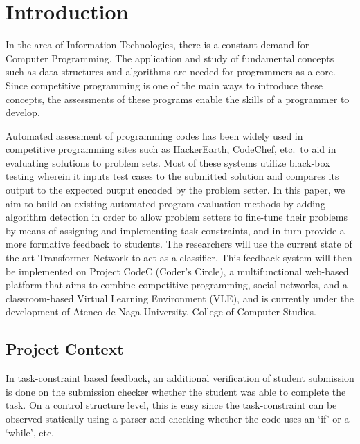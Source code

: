 \chapter{Introduction}


In the area of Information Technologies, there is a constant demand for Computer Programming. 
The application and study of fundamental concepts such as data structures and algorithms are 
needed for programmers as a core. Since competitive programming is one of the main ways to 
introduce these concepts, the assessments of these programs enable the skills of a programmer 
to develop\cite{oqvist2018coding}.

Automated assessment of programming codes has been widely used in competitive programming 
sites such as HackerEarth, CodeChef, etc.\ to aid in evaluating solutions to problem sets. 
Most of these systems utilize black-box testing wherein it inputs test cases to the submitted 
solution and compares its output to the expected output encoded by the problem setter. 
In this paper, we aim to build on existing automated program evaluation methods by adding 
algorithm detection in order to allow problem setters to fine-tune their problems by means of 
assigning and implementing task-constraints, and in turn provide a more formative feedback to 
students. The researchers will use the current state of the art Transformer Network to act as 
a classifier. This feedback system will then be implemented on Project CodeC (Coder’s Circle), 
a multifunctional web-based platform that aims to combine competitive programming, social networks, 
and a classroom-based Virtual Learning Environment (VLE), and is currently under the development 
of Ateneo de Naga University, College of Computer Studies.




\section{Project Context}

In task-constraint based feedback, an additional verification of student submission is done 
on the submission checker whether the student was able to complete the task. On a control 
structure level, this is easy since the task-constraint can be observed statically using a 
parser and checking whether the code uses an `if' or a `while', etc.

